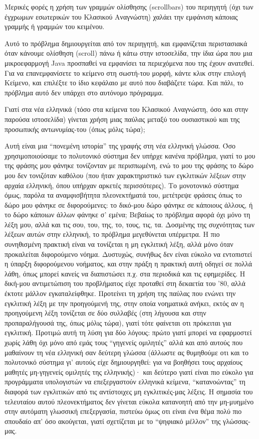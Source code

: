 \documentclass[11pt]{article}
\begin{document}
Μερικές φορές η χρήση των γραμμών ολίσθησης (scrollbars) του περιηγητή (όχι των έγχρωμων εσωτερικών του Κλασικού Αναγνώστη) χαλάει την εμφάνιση κάποιας γραμμής ή γραμμών του κειμένου.

Αυτό το πρόβλημα δημιουργείται από τον περιηγητή, και εμφανίζεται περιστασιακά όταν κάνουμε ολίσθηση (scroll) πάνω ή κάτω στην ιστοσελίδα, την ίδια ώρα που μια μικροεφαρμογή Java προσπαθεί να εμφανίσει τα περιεχόμενα που της έχουν ανατεθεί. Για να επανεμφανίσετε το κείμενο στη σωστή-του μορφή, κάντε κλικ στην επιλογή Κείμενο, και επιλέξτε το ίδιο κεφάλαιο με αυτό που διαβάζετε τώρα. Και πάλι, το πρόβλημα αυτό δεν υπάρχει στο αυτόνομο πρόγραμμα.

Γιατί στα νέα ελληνικά (τόσο στα κείμενα του Κλασικού Αναγνώστη, όσο και στην παρούσα ιστοσελίδα) γίνεται χρήση μιας παύλας μεταξύ του ουσιαστικού και της προσωπικής αντωνυμίας-του (όπως μόλις τώρα);

Αυτή είναι μια “πονεμένη ιστορία” της γραφής στη νέα ελληνική γλώσσα. Όσο χρησιμοποιούσαμε το πολυτονικό σύστημα δεν υπήρχε κανένα πρόβλημα, γιατί το μου της φράσης μου φάνηκε τονίζονταν με περισπωμένη, ενώ το μου της φράσης το δώρο μου δεν τονιζόταν καθόλου (που ήταν χαρακτηριστικό των εγκλιτικών λέξεων στην αρχαία ελληνική, όπου υπήρχαν αρκετές περισσότερες). Το μονοτονικό σύστημα όμως, παρόλα τα αναμφισβήτητα πλεονεκτήματά του, μετέτρεψε φράσεις όπως το δώρο μου φάνηκε σε διφορούμενες: το δικό-μου δώρο φάνηκε σε κάποιους άλλους, ή το δώρο κάποιων άλλων φάνηκε σ’ εμένα; Βεβαίως το πρόβλημα αφορά όχι μόνο τη λέξη μου, αλλά και τις σου, του, της, το, τους, τις, τα. Δοσμένης της συχνότητας των λέξεων αυτών στην ελληνική, το πρόβλημα μεγεθύνεται υπέρμετρα. Η πιο συνηθισμένη πρακτική είναι να τονίζεται η μη εγκλιτική λέξη, αλλά μόνο όταν προκαλείται διφορούμενο νόημα. Δυστυχώς, συνήθως δεν είναι εύκολο να εντοπιστεί η ύπαρξη διφορούμενου νοήματος, και στην πράξη η πρακτική αυτή οδηγεί σε πολλά λάθη, όπως μπορεί κανείς να διαπιστώσει π.χ. στα περιοδικά και τις εφημερίδες. Η δική-μου αντιμετώπιση του προβλήματος είχε προταθεί στη δεκαετία του ’80, αλλά έκτοτε μάλλον εγκαταλείφθηκε. Προτείνει τη χρήση της παύλας που ενώνει την εγκλιτική λέξη με την προηγούμενή της, στην οποία νοηματικά ανήκει, εκτός αν η προηγούμενη λέξη τονίζεται σε δύο συλλαβές (στη λήγουσα και στην προπαραλήγουσά της, όπως μόλις τώρα), γιατί τότε φαίνεται οτι πρόκειται για εγκλιτική. Προτιμώ αυτή τη λύση για δύο λόγους: πρώτο γιατί μπορεί να εφαρμοστεί χωρίς λάθη όχι μόνο από εμάς τους “γηγενείς ομιλητές” αλλά και από αυτούς που μαθαίνουν τη νέα ελληνική σαν δεύτερη γλώσσα (άλλωστε ας θυμηθούμε οτι και το πολυτονικό σύστημα γι’ αυτούς είχε δημιουργηθεί: για να βοηθήσει τους αρχαίους μαθητές μη-γηγενείς ομιλητές της ελληνικής)· και δεύτερο γιατί είναι πιο εύκολο για προγράμματα υπολογιστών να επεξεργαστούν ελληνικά κείμενα, “κατανοώντας” τη διαφορά των εγκλιτικών από τις αντίστοιχες μη εγκλιτικές-μας λέξεις. Η σημασία του τελευταίου αυτού πλεονεκτήματος δεν γίνεται εύκολα κατανοητή από την μη-μυημένο στην αυτόματη γλωσσική επεξεργασία, πιστεύω όμως οτι είναι ένα θέμα πολύ πιο σπουδαίο απ’ όσο ακούγεται, γιατί σχετίζεται με το “ψηφιακό μέλλον” της γλώσσας-μας.
\end{document}
